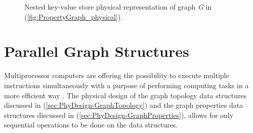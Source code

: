 {\begin{figure}[H]
\centering
\centering
    \caption{Nested key-value store physical representation of graph \textit{G} in (\ref{fig:PropertyGraph_physical}).}
    \label{fig:NestedStore_physical}
\end{figure}



\section{Parallel Graph Structures}
\label{sec:PhyDesign-ParallelGraphStructs}

Multiprocessor computers are offering the possibility to execute multiple instructions simultaneously with a purpose of performing computing tasks in a more efficient way \cite{cormen2009introduction}. The physical design of the graph topology data structures discussed in (\ref{sec:PhyDesign-GraphTopology}) and the graph properties data structures discussed in (\ref{sec:PhyDesign-GraphProperties}), allows for only sequential operations to be done on the data structures.

}
